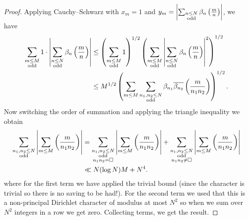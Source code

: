 \documentclass{lecturenotes}
\numberwithin{equation}{section}
\begin{document}
\begin{proof}
    Applying Cauchy--Schwarz with $x_m=1$ and $y_m=\left|{\sum_{\substack{n\leq N\\\textnormal{odd}}}\beta_n\left(\frac{m}{n}\right)}\right|$, we have
    \begin{align*}
    \sum_{\substack{m\leq M\\\textnormal{odd}}}1\cdot \left|{\sum_{\substack{n\leq N\\\textnormal{odd}}}\beta_n\left(\frac{m}{n}\right)}\right|
    &\leq \left({\sum_{\substack{m\leq M\\\textnormal{odd}}}1}\right)^{1/2}
    \left({\sum_{\substack{m\leq M\\\textnormal{odd}}}\left|{\sum_{\substack{n\leq N\\\textnormal{odd}}}\beta_n\left(\frac{m}{n}\right)}\right|^2}\right)^{1/2}
    \\&\leq M^{1/2}
    \left({\sum_{\substack{m\leq M}}{\sum_{\substack{n_1,n_2\leq N\\\textnormal{odd}}}\beta_{n_1}\overline{\beta_{n_2}}\left(\frac{m}{n_1n_2}\right)}}\right)^{1/2}.
    \end{align*}
    Now switching the order of summation and applying the triangle inequality we obtain
    \begin{align*}
        \sum_{\substack{n_1,n_2\leq N\\\textnormal{odd}}}\left|{\sum_{m\leq M}\left(\frac{m}{n_1n_2}\right)}\right|
        &=\sum_{\substack{n_1,n_2\leq N\\\textnormal{odd}\\n_1n_2=\square}}\left|{\sum_{m\leq M}\left(\frac{m}{n_1n_2}\right)}\right|
        +\sum_{\substack{n_1,n_2\leq N\\\textnormal{odd}\\n_1n_2\neq\square}}\left|{\sum_{m\leq M}\left(\frac{m}{n_1n_2}\right)}\right|
        \\&\ll N(\log N)M+N^{4}.
    \end{align*}
    where for the first term we have applied the trivial bound (since the character is trivial so there is no saving to be had!).  For the second term we used that this is a non-principal Dirichlet character of modulus at most $N^2$ so when we sum over $N^2$ integers in a row we get zero.  Collecting terms, we get the result.
\end{proof}
\end{document}
